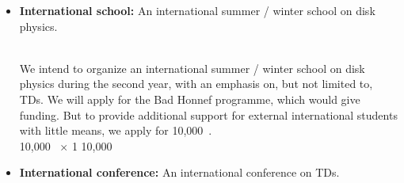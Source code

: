 \documentclass[10pt,fleqn,twoside]{article}
\begin{document}
\begin{itemize}
\item 
\begin{Emphasize}
{\bf International school:} An international summer / winter school on disk physics.
\end{Emphasize}\\
We intend to organize an international summer / winter school on disk physics
during the second year,
with an emphasis on, but not limited to, TDs. We will apply for the Bad Honnef
programme, which would give funding. But to provide additional support for
external international students with little means, we apply for 10,000~\EUR{}. 
\vspace{0.2em}\\
10,000~\EUR{} $\times$ 1              \hfill 10,000~\EUR{}\\
\item 
\begin{Emphasize}
{\bf International conference:} An international conference on TDs.
\end{Emphasize}\\

\end{itemize}
\end{document}
